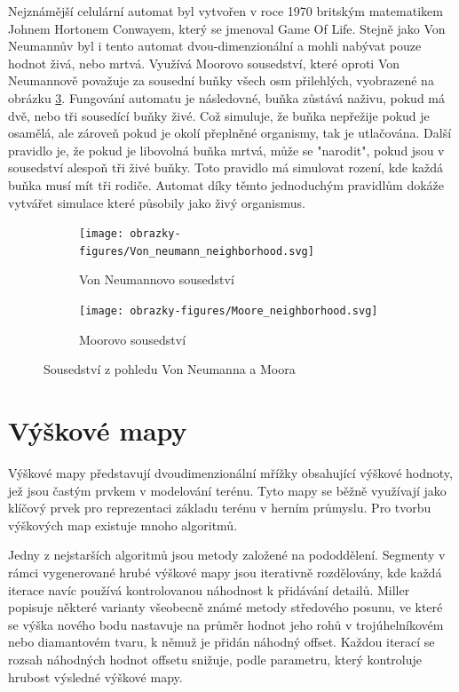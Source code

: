 Nejznámější celulární automat byl vytvořen v roce 1970 britským matematikem Johnem Hortonem Conwayem, který se jmenoval Game Of Life. Stejně jako Von Neumannův byl i tento automat dvou-dimenzionální a mohli nabývat pouze hodnot živá, nebo mrtvá. Využívá Moorovo sousedství, které oproti Von Neumannově považuje za sousední buňky všech osm přilehlých, vyobrazené na obrázku \ref{moore}. Fungování automatu je následovné, buňka zůstává naživu, pokud má dvě, nebo tři sousedící buňky živé. Což simuluje, že buňka nepřežije pokud je osamělá, ale zároveň pokud je okolí přeplněné organismy, tak je utlačována. Další pravidlo je, že pokud je libovolná buňka mrtvá, může se "narodit", pokud jsou v sousedství alespoň tři živé buňky. Toto pravidlo má simulovat rození, kde každá buňka musí mít tři rodiče. Automat díky těmto jednoduchým pravidlům dokáže vytvářet simulace které působily jako živý organismus. \cite{Gong2017}

\begin{figure}[h]
	\centering
	\begin{subfigure}{0.475\textwidth}
		\label{vonNeumann}
		\centering
		\texttt{[image: obrazky-figures/Von\_neumann\_neighborhood.svg]}
		\caption{Von Neumannovo sousedství}
	\end{subfigure}
	\begin{subfigure}{0.475\textwidth}
		\label{moore}
		\centering
		\texttt{[image: obrazky-figures/Moore\_neighborhood.svg]}
		\caption{Moorovo sousedství}
	\end{subfigure}
	\caption{Sousedství z pohledu Von Neumanna a Moora}
\end{figure}

\section{Výškové mapy}
\label{heightMaps}
Výškové mapy představují dvoudimenzionální mřížky obsahující výškové hodnoty, jež jsou častým prvkem v modelování terénu. Tyto mapy se běžně využívají jako klíčový prvek pro reprezentaci základu terénu v herním průmyslu. Pro tvorbu výškových map existuje mnoho algoritmů.

Jedny z nejstarších algoritmů jsou metody založené na pododdělení. Segmenty v rámci vygenerované hrubé výškové mapy jsou iterativně rozdělovány, kde každá iterace navíc používá kontrolovanou náhodnost k přidávání detailů. Miller \cite{MillerRendering} popisuje některé varianty všeobecně známé metody středového posunu, ve které se výška nového bodu nastavuje na průměr hodnot jeho rohů v trojúhelníkovém nebo diamantovém tvaru, k němuž je přidán náhodný offset. Každou iterací se rozsah náhodných hodnot offsetu snižuje, podle parametru, který kontroluje hrubost výsledné výškové mapy. 

